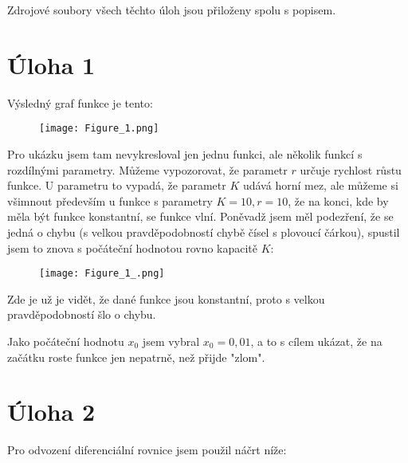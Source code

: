 \documentclass{fkssolpub}
\author{Ondřej Sedláček}
\begin{document}
 

Zdrojové soubory všech těchto úloh jsou přiloženy spolu s popisem.

\section{Úloha 1}

Výsledný graf funkce je tento:

\begin{figure}[h]
  \texttt{[image: Figure\_1.png]}
  \centering
\end{figure}

Pro ukázku jsem tam nevykresloval jen jednu funkci, ale několik funkcí s
rozdílnými parametry. Můžeme vypozorovat, že parametr $r$ určuje rychlost
růstu funkce. U parametru to vypadá, že parametr $K$ udává horní mez,
ale můžeme si všimnout především u funkce s parametry $K = 10, r = 10$,
že na konci, kde by měla být funkce konstantní, se funkce vlní. Poněvadž
jsem měl podezření, že se jedná o chybu (s velkou pravděpodobností chybě
čísel s plovoucí čárkou), spustil jsem to znova s počáteční hodnotou
rovno kapacitě $K$:

\begin{figure}[h]
  \texttt{[image: Figure\_1\_.png]}
  \centering
\end{figure}

Zde je už je vidět, že dané funkce jsou konstantní, proto s velkou
pravděpodobností šlo o chybu.

Jako počáteční hodnotu $x_0$ jsem vybral $x_0 = 0,01$, a to s cílem ukázat,
že na začátku roste funkce jen nepatrně, než přijde "zlom".

\clearpage
\section{Úloha 2}

Pro odvození diferenciální rovnice jsem použil náčrt níže:

\begin{figure}[h]
  \centering
\end{figure}
\end{document}
